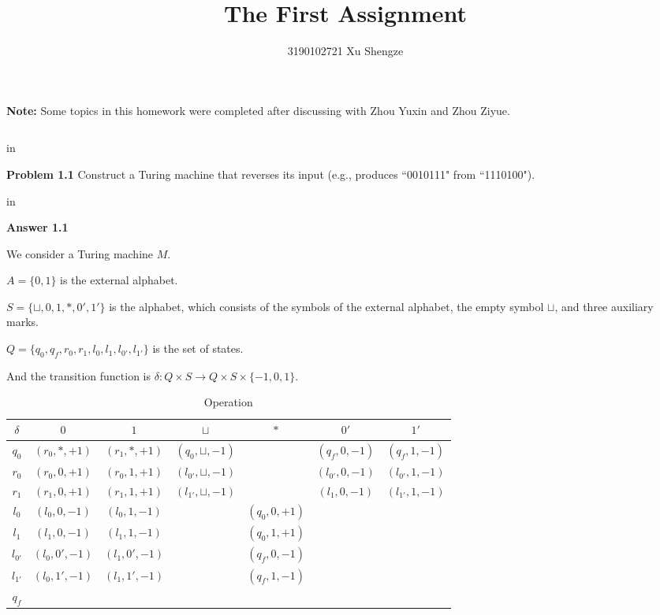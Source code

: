 \documentclass[11pt]{article}
\begin{document}
\title{{\bf The First Assignment}}
\author{3190102721 Xu Shengze}
\date{}
\maketitle

{\bf Note:} Some topics in this homework were completed after discussing with Zhou Yuxin and Zhou Ziyue.

\begin{tabular*}{13cm}{r}
\hline
\end{tabular*}

 in

{\bf Problem 1.1} Construct a Turing machine that reverses its input (e.g., produces ``0010111" from ``1110100").

 in

{\bf Answer 1.1 }

We consider a Turing machine $M$.

$A=\{0,1\}$ is the external alphabet.

$S=\{\sqcup ,0,1,\ast,0',1'\}$ is the alphabet, which consists of the symbols of the external alphabet, the empty symbol $\sqcup$, and three auxiliary marks.

$Q=\{q_0,q_f,r_0,r_1,l_0,l_1,l_{0'},l_{1'}\}$ is the set of states.

And the transition function is $\delta: Q\times S \to Q \times S \times \{−1, 0, 1\}$.

\begin{table}[h]
	\centering
	\caption{Operation}
	\begin{tabular}{|c|cccccc|}
		\hline
		$\delta$ & $0$ & $1$ & $\sqcup$ & $\ast$ & $0'$ & $1'$ \\
		\hline
		$q_0$ & $(r_0,\ast,+1)$ & $(r_1,\ast,+1)$ & $(q_0,\sqcup,-1)$ &  & $(q_f,0,-1)$ & $(q_f,1,-1)$ \\
		$r_0$ & $(r_0,0,+1)$ & $(r_0,1,+1)$ & $(l_{0'},\sqcup,-1)$ &  & $(l_{0'},0,-1)$ & $(l_{0'},1,-1)$ \\
		$r_1$ & $(r_1,0,+1)$ & $(r_1,1,+1)$ & $(l_{1'},\sqcup,-1)$ &  & $(l_1,0,-1)$ & $(l_{1'},1,-1)$ \\
		$l_0$ & $(l_0,0,-1)$ & $(l_0,1,-1)$ &  & $(q_0,0,+1)$ &  &  \\
		$l_1$ & $(l_1,0,-1)$ & $(l_1,1,-1)$ &  &  $(q_0,1,+1)$ &  &  \\
		$l_{0'}$ & $(l_0,0',-1)$ & $(l_1,0',-1)$ &  &  $(q_f,0,-1)$ &  &  \\
		$l_{1'}$ & $(l_0,1',-1)$ & $(l_1,1',-1)$ &  &  $(q_f,1,-1)$ &  &  \\
		$q_f$ &  &  &  &  &  &  \\
		\hline
	\end{tabular}
\end{table}
\end{document}
